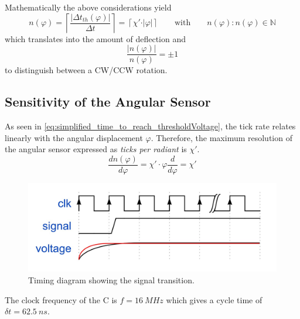         Mathematically the above considerations yield
        \begin{equation}
            n(\varphi) = \left\lceil \frac{\left\vert \Delta t_{th}(\varphi) \right\vert }{\Delta t} \right\rceil = \left\lceil \chi' \cdot \vert\varphi\vert \right\rceil \qquad \text{with} \qquad n(\varphi): n(\varphi) \in \mathbb{N}
            \label{eq:value_of_cycle_Count}
        \end{equation}
        which translates into the amount of deflection and
        \begin{equation}
            \frac{\vert n(\varphi)\vert}{n(\varphi)} = \pm 1
            \label{eq:sign_of_cycle_count}
        \end{equation}
        to distinguish between a CW/CCW rotation.
    \subsection{Sensitivity of the Angular Sensor}\label{sec:preparation_task_8}
        As seen in \cref{eq:simplified_time_to_reach_thresholdVoltage}, the tick rate relates linearly with the angular displacement \( \varphi \).
        Therefore, the maximum resolution of the angular sensor expressed as \textit{ticks per radiant} is \( \chi' \).
        \begin{equation}
            \frac{dn(\varphi)}{d\varphi} = \chi' \cdot \varphi \frac{d}{d\varphi} = \chi'
        \end{equation}
        \begin{figure}[H]
            \centering
            \includegraphics[width=.7\textwidth]{aufbau/clk_signal_timing_diagram.jpg}
            \caption[Timing diagram showing the signal transition]{Timing diagram showing the signal transition.}
            \label{fig:timing_diagram}
        \end{figure}
        The clock frequency of the \micro C is \( f = \SI{16}{MHz} \) which gives a cycle time of \( \delta t = \SI{62.5}{ns} \).
        
